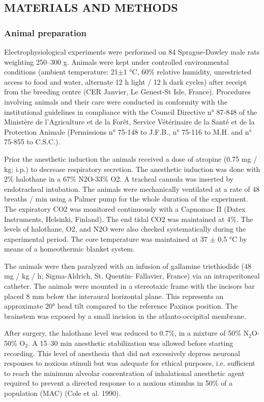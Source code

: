 \documentclass[a4paper,12pt,twoside]{report}
\begin{document}
\subsection{MATERIALS AND METHODS}

\subsubsection{Animal preparation}

Electrophysiological experiments were performed on 84 Sprague-Dawley male rats weighting 250–300 g. Animals were kept under controlled environmental conditions (ambient temperature: 21$\pm$1 °C, 60\% relative humidity, unrestricted access to food and water, alternate 12 h light / 12 h dark cycles) after receipt from the breeding centre (CER Janvier, Le Genest-St Isle, France). Procedures involving animals and their care were conducted in conformity with the institutional guidelines in compliance with the Council Directive n° 87-848 of the Ministère de l’Agriculture et de la Forêt, Service Vétérinaire de la Santé et de la Protection Animale (Permissions n° 75-148 to J.F.B., n° 75-116 to M.H. and n° 75-855 to C.S.C.). 

Prior the anesthetic induction the animals received a dose of atropine (0.75 mg / kg; i.p.) to decrease respiratory secretion. The anesthetic induction was done with 2\% halothane in a 67\% N2O-33\% O2. A tracheal cannula was inserted by endotracheal intubation. The animals were mechanically ventilated at a rate of 48 breaths / min using a Palmer pump for the whole duration of the experiment. The expiratory CO2 was monitored continuously with a Capnomac II (Datex Instruments, Helsinki, Finland). The end tidal CO2 was maintained at 4\%. The levels of halothane, O2, and N2O were also checked systematically during the experimental period. The core temperature was maintained at 37 $\pm$ 0.5 °C by means of a homeothermic blanket system.

The animals were then paralyzed with an infusion of gallamine triethiodide (48 mg / kg / h; Sigma-Aldrich, St. Quentin- Fallavier, France) via an intraperitoneal catheter. The animals were mounted in a stereotaxic frame with the incisors bar placed 8 mm below the interaural horizontal plane. This represents an approximate 20° head tilt compared to the reference Paxinos position. The brainstem was exposed by a small incision in the atlanto-occipital membrane. 

After surgery, the halothane level was reduced to 0.7\%, in a mixture of 50\% N$_{2}$O-50\% O$_{2}$. A 15–30 min anesthetic stabilization was allowed before starting recording. This level of anesthesia that did not excessively depress neuronal responses to noxious stimuli but was adequate for ethical purposes, i.e. sufficient to reach the minimum alveolar concentration of inhalational anesthetic agent required to prevent a directed response to a noxious stimulus in 50\% of a population (MAC) (Cole et al. 1990). 
\end{document}
